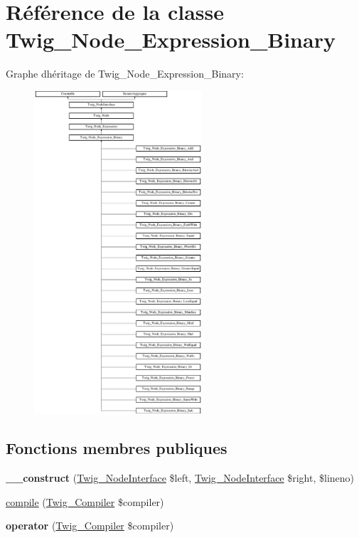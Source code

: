 \hypertarget{class_twig___node___expression___binary}{}\section{Référence de la classe Twig\+\_\+\+Node\+\_\+\+Expression\+\_\+\+Binary}
\label{class_twig___node___expression___binary}
Graphe d\textquotesingle{}héritage de Twig\+\_\+\+Node\+\_\+\+Expression\+\_\+\+Binary\+:\begin{figure}[H]
\begin{center}
\leavevmode
\includegraphics[height=12.000000cm]{class_twig___node___expression___binary}
\end{center}
\end{figure}
\subsection*{Fonctions membres publiques}
\begin{DoxyCompactItemize}
\item 
{\bfseries \+\_\+\+\_\+construct} (\hyperlink{interface_twig___node_interface}{Twig\+\_\+\+Node\+Interface} \$left, \hyperlink{interface_twig___node_interface}{Twig\+\_\+\+Node\+Interface} \$right, \$lineno)\hypertarget{class_twig___node___expression___binary_a188d713363d22fc94efa0d14cf6b588c}{}\label{class_twig___node___expression___binary_a188d713363d22fc94efa0d14cf6b588c}

\item 
\hyperlink{class_twig___node___expression___binary_a4e0faa87c3fae583620b84d3607085da}{compile} (\hyperlink{class_twig___compiler}{Twig\+\_\+\+Compiler} \$compiler)
\item 
{\bfseries operator} (\hyperlink{class_twig___compiler}{Twig\+\_\+\+Compiler} \$compiler)\hypertarget{class_twig___node___expression___binary_af77318ec88d5f8a508684970a150b670}{}\label{class_twig___node___expression___binary_af77318ec88d5f8a508684970a150b670}

\end{DoxyCompactItemize}
